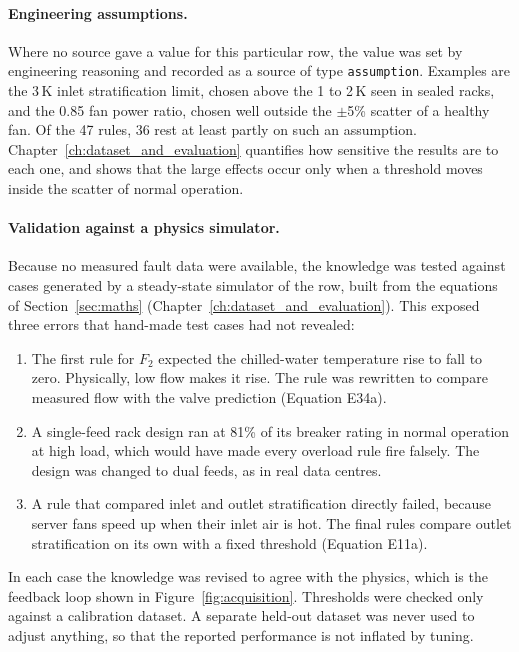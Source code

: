 \paragraph{Engineering assumptions.} Where no source gave a value for this particular row, the value was set by engineering reasoning and recorded as a source of type \texttt{assumption}. Examples are the 3\,K inlet stratification limit, chosen above the 1 to 2\,K seen in sealed racks, and the 0.85 fan power ratio, chosen well outside the $\pm$5\% scatter of a healthy fan. Of the 47 rules, 36 rest at least partly on such an assumption. Chapter~\ref{ch:dataset_and_evaluation} quantifies how sensitive the results are to each one, and shows that the large effects occur only when a threshold moves inside the scatter of normal operation.

\paragraph{Validation against a physics simulator.} Because no measured fault data were available, the knowledge was tested against cases generated by a steady-state simulator of the row, built from the equations of Section~\ref{sec:maths} (Chapter~\ref{ch:dataset_and_evaluation}). This exposed three errors that hand-made test cases had not revealed:
\begin{enumerate}
  \item The first rule for $F_2$ expected the chilled-water temperature rise to fall to zero. Physically, low flow makes it rise. The rule was rewritten to compare measured flow with the valve prediction (Equation E34a).
  \item A single-feed rack design ran at 81\% of its breaker rating in normal operation at high load, which would have made every overload rule fire falsely. The design was changed to dual feeds, as in real data centres.
  \item A rule that compared inlet and outlet stratification directly failed, because server fans speed up when their inlet air is hot. The final rules compare outlet stratification on its own with a fixed threshold (Equation E11a).
\end{enumerate}
In each case the knowledge was revised to agree with the physics, which is the feedback loop shown in Figure~\ref{fig:acquisition}. Thresholds were checked only against a calibration dataset. A separate held-out dataset was never used to adjust anything, so that the reported performance is not inflated by tuning.
